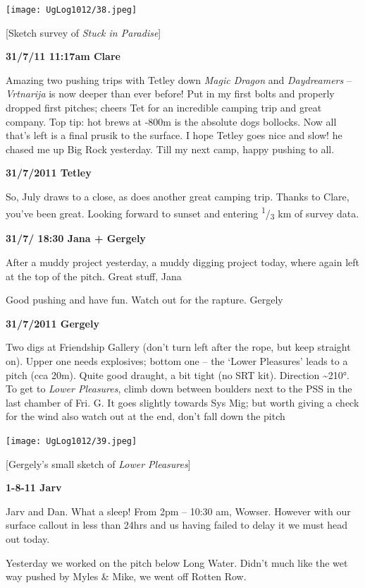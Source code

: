 \texttt{[image: UgLog1012/38.jpeg]}

{[}Sketch survey of \emph{Stuck in Paradise}{]}

\textbf{31/7/11 11:17am Clare}

Amazing two pushing trips with Tetley down \emph{Magic Dragon} and
\emph{Daydreamers} -- \emph{Vrtnarija} is now deeper than ever before!
Put in my first bolts and properly dropped first pitches; cheers Tet for
an incredible camping trip and great company. Top tip: hot brews at
-800m is the absolute dogs bollocks. Now all that's left is a final
prusik to the surface. I hope Tetley goes nice and slow! he chased me up
Big Rock yesterday. Till my next camp, happy pushing to all.

\textbf{31/7/2011 Tetley}

So, July draws to a close, as does another great camping trip. Thanks to
Clare, you've been great. Looking forward to sunset and entering
\textsuperscript{1}/\textsubscript{3} km of survey data.

\textbf{31/7/ 18:30 Jana + Gergely}

After a muddy project yesterday, a muddy digging project today, where
again left at the top of the pitch. Great stuff, Jana

Good pushing and have fun. Watch out for the rapture. Gergely

\textbf{31/7/2011 Gergely}

Two digs at Friendship Gallery (don't turn left after the rope, but keep
straight on). Upper one needs explosives; bottom one -- the `Lower
Pleasures' leads to a pitch (cca 20m). Quite good draught, a bit tight
(no SRT kit). Direction \textasciitilde{}210°. To get to \emph{Lower
Pleasures}, climb down between boulders next to the PSS in the last
chamber of Fri. G. It goes slightly towards Sys Mig; but worth giving a
check for the wind also watch out at the end, don't fall down the pitch

\texttt{[image: UgLog1012/39.jpeg]}

{[}Gergely's small sketch of \emph{Lower Pleasures}{]}

\textbf{1-8-11 Jarv}

Jarv and Dan. What a sleep! From 2pm -- 10:30 am, Wowser. However with
our surface callout in less than 24hrs and us having failed to delay it
we must head out today.

Yesterday we worked on the pitch below Long Water. Didn't much like the
wet way pushed by Myles \& Mike, we went off Rotten Row.

